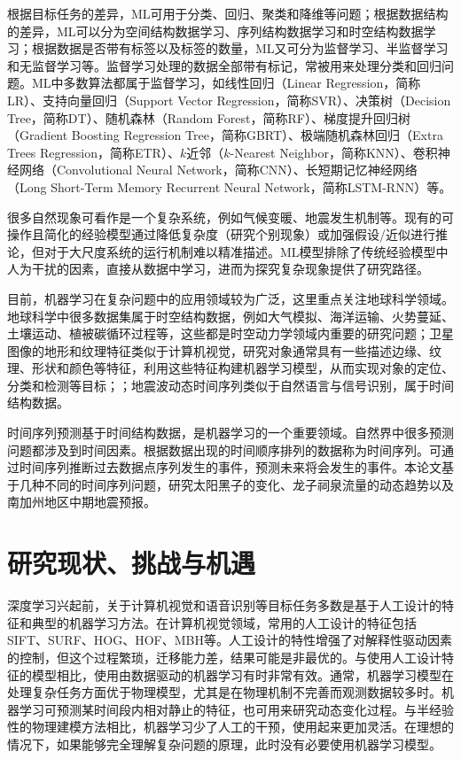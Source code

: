 根据目标任务的差异，ML可用于分类、回归、聚类和降维等问题；根据数据结构的差异，ML可以分为空间结构数据学习、序列结构数据学习和时空结构数据学习；根据数据是否带有标签以及标签的数量，ML又可分为监督学习、半监督学习和无监督学习等。监督学习处理的数据全部带有标记，常被用来处理分类和回归问题。ML中多数算法都属于监督学习，如线性回归（Linear Regression，简称LR）、支持向量回归（Support Vector Regression，简称SVR）、决策树（Decision Tree，简称DT）、随机森林（Random Forest，简称RF）、梯度提升回归树（Gradient Boosting Regression Tree，简称GBRT）、极端随机森林回归（Extra Trees Regression，简称ETR）、$k$近邻（$k$-Nearest Neighbor，简称KNN）、卷积神经网络（Convolutional Neural Network，简称CNN）、长短期记忆神经网络（Long Short-Term Memory Recurrent Neural Network，简称LSTM-RNN）等。

很多自然现象可看作是一个复杂系统，例如气候变暖、地震发生机制等\citep{fan2021statistical}。现有的可操作且简化的经验模型通过降低复杂度（研究个别现象）或加强假设/近似进行推论，但对于大尺度系统的运行机制难以精准描述。ML模型排除了传统经验模型中人为干扰的因素，直接从数据中学习，进而为探究复杂现象提供了研究路径。

目前，机器学习在复杂问题中的应用领域较为广泛，这里重点关注地球科学领域。地球科学中很多数据集属于时空结构数据，例如大气模拟、海洋运输、火势蔓延、土壤运动、植被碳循环过程等，这些都是时空动力学领域内重要的研究问题\citep{mathieu2015deep,oh2015action}；卫星图像的地形和纹理特征类似于计算机视觉，研究对象通常具有一些描述边缘、纹理、形状和颜色等特征，利用这些特征构建机器学习模型，从而实现对象的定位、分类和检测等目标\citep{lee1990neural}；；地震波动态时间序列类似于自然语言与信号识别，属于时间结构数据\citep{rouet2017machine,perol2018convolutional,devries2018deep}。

时间序列预测基于时间结构数据，是机器学习的一个重要领域。自然界中很多预测问题都涉及到时间因素。根据数据出现的时间顺序排列的数据称为时间序列。可通过时间序列推断过去数据点序列发生的事件，预测未来将会发生的事件。本论文基于几种不同的时间序列问题，研究太阳黑子的变化、龙子祠泉流量的动态趋势以及南加州地区中期地震预报。

\section{研究现状、挑战与机遇}\label{sec:intro_veiw}

深度学习兴起前，关于计算机视觉和语音识别等目标任务多数是基于人工设计的特征和典型的机器学习方法。在计算机视觉领域，常用的人工设计的特征包括SIFT、SURF、HOG、HOF、MBH等。人工设计的特性增强了对解释性驱动因素的控制，但这个过程繁琐，迁移能力差，结果可能是非最优的。与使用人工设计特征的模型相比，使用由数据驱动的机器学习有时非常有效。通常，机器学习模型在处理复杂任务方面优于物理模型，尤其是在物理机制不完善而观测数据较多时。机器学习可预测某时间段内相对静止的特征，也可用来研究动态变化过程。与半经验性的物理建模方法相比，机器学习少了人工的干预，使用起来更加灵活。在理想的情况下，如果能够完全理解复杂问题的原理，此时没有必要使用机器学习模型。

